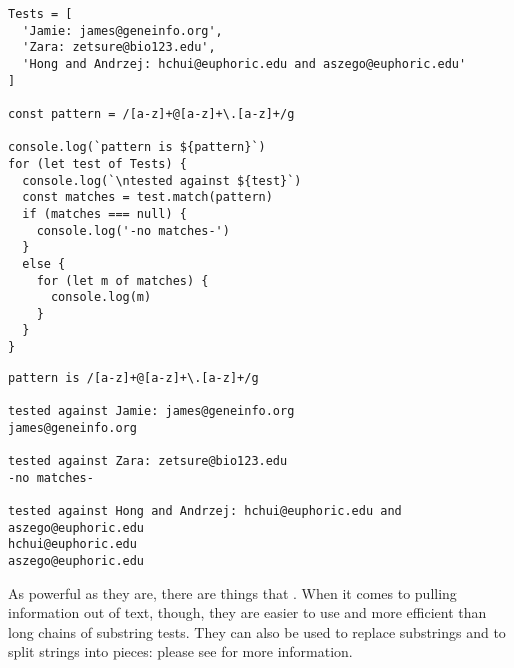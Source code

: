 \begin{verbatim}
Tests = [
  'Jamie: james@geneinfo.org',
  'Zara: zetsure@bio123.edu',
  'Hong and Andrzej: hchui@euphoric.edu and aszego@euphoric.edu'
]

const pattern = /[a-z]+@[a-z]+\.[a-z]+/g

console.log(`pattern is ${pattern}`)
for (let test of Tests) {
  console.log(`\ntested against ${test}`)
  const matches = test.match(pattern)
  if (matches === null) {
    console.log('-no matches-')
  }
  else {
    for (let m of matches) {
      console.log(m)
    }
  }
}
\end{verbatim}

\begin{verbatim}
pattern is /[a-z]+@[a-z]+\.[a-z]+/g

tested against Jamie: james@geneinfo.org
james@geneinfo.org

tested against Zara: zetsure@bio123.edu
-no matches-

tested against Hong and Andrzej: hchui@euphoric.edu and aszego@euphoric.edu
hchui@euphoric.edu
aszego@euphoric.edu
\end{verbatim}

As powerful as they are,
there are things that .
When it comes to pulling information out of text,
though,
they are easier to use and more efficient than long chains of substring tests.
They can also be used to replace substrings and to split strings into pieces:
please see  for more information.
